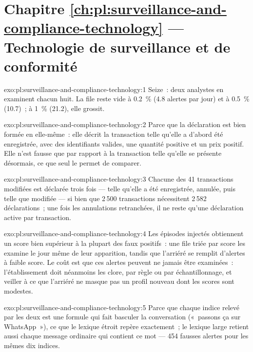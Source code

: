 \section*{Chapitre \ref{ch:pl:surveillance-and-compliance-technology} --- Technologie de surveillance et de conformité}

\begin{solution}{exo:pl:surveillance-and-compliance-technology:1}
Seize~: deux analystes en examinent chacun huit. La file reste vide à 0.2~\% (4.8 alertes par jour) et à 0.5~\% (10.7)~; à 1~\% (21.2), elle grossit.
\end{solution}

\begin{solution}{exo:pl:surveillance-and-compliance-technology:2}
Parce que la déclaration est bien formée en elle-même~: elle décrit la transaction telle qu'elle a d'abord été enregistrée, avec des identifiants valides, une quantité positive et
un prix positif. Elle n'est fausse que par rapport à la transaction telle qu'elle se présente désormais, ce que seul le  permet de comparer.
\end{solution}

\begin{solution}{exo:pl:surveillance-and-compliance-technology:3}
Chacune des 41 transactions modifiées est déclarée trois fois --- telle qu'elle a été enregistrée, annulée, puis telle que modifiée --- si bien que 2\,500 transactions nécessitent 2\,582 déclarations~;
une fois les annulations retranchées, il ne reste qu'une déclaration active par transaction.
\end{solution}

\begin{solution}{exo:pl:surveillance-and-compliance-technology:4}
Les épisodes injectés obtiennent un score bien supérieur à la plupart des faux positifs~: une file triée par score les examine le jour même de leur apparition, tandis que l'arriéré se remplit
d'alertes à faible score. Le coût est que ces alertes peuvent ne jamais être examinées~: l'établissement doit néanmoins les clore, par règle ou par échantillonnage,
et veiller à ce que l'arriéré ne masque pas un profil nouveau dont les scores sont modestes.
\end{solution}

\begin{solution}{exo:pl:surveillance-and-compliance-technology:5}
Parce que chaque indice relevé par les deux est une formule qui fait basculer la conversation («~passons ça sur WhatsApp~»), ce que le lexique étroit
repère exactement~; le lexique large retient aussi chaque message ordinaire qui contient ce mot --- 454 fausses alertes pour les mêmes
dix indices.
\end{solution}

